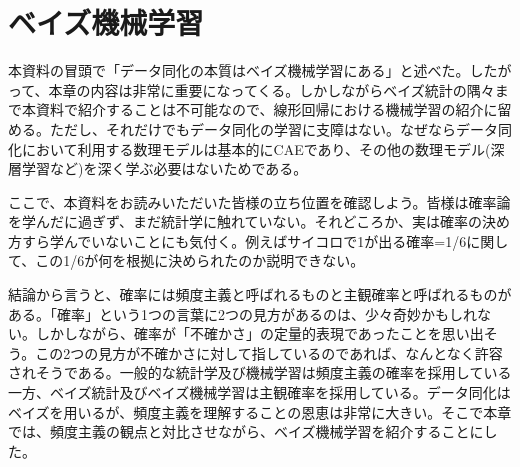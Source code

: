 \documentclass[dvipdfmx, 9pt, a4paper]{jsarticle}
\begin{document}
\section{ベイズ機械学習}
本資料の冒頭で「データ同化の本質はベイズ機械学習にある」と述べた。したがって、本章の内容は非常に重要になってくる。しかしながらベイズ統計の隅々まで本資料で紹介することは不可能なので、線形回帰における機械学習の紹介に留める。ただし、それだけでもデータ同化の学習に支障はない。なぜならデータ同化において利用する数理モデルは基本的にCAEであり、その他の数理モデル(深層学習など)を深く学ぶ必要はないためである。\par
ここで、本資料をお読みいただいた皆様の立ち位置を確認しよう。皆様は確率論を学んだに過ぎず、まだ統計学に触れていない。それどころか、実は確率の決め方すら学んでいないことにも気付く。例えばサイコロで1が出る確率=1/6に関して、この1/6が何を根拠に決められたのか説明できない。\par
結論から言うと、確率には頻度主義と呼ばれるものと主観確率と呼ばれるものがある。「確率」という1つの言葉に2つの見方があるのは、少々奇妙かもしれない。しかしながら、確率が「不確かさ」の定量的表現であったことを思い出そう。この2つの見方が不確かさに対して指しているのであれば、なんとなく許容されそうである。一般的な統計学及び機械学習は頻度主義の確率を採用している一方、ベイズ統計及びベイズ機械学習は主観確率を採用している。データ同化はベイズを用いるが、頻度主義を理解することの恩恵は非常に大きい。そこで本章では、頻度主義の観点と対比させながら、ベイズ機械学習を紹介することにした。
\end{document}
